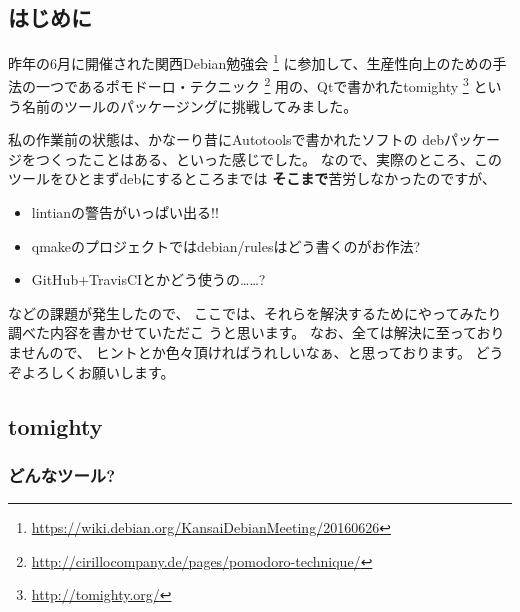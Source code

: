 \documentclass[mingoth,a4paper]{jsarticle}
\begin{document}

\subsection{はじめに}

昨年の6月に開催された関西Debian勉強会
\footnote{\url{https://wiki.debian.org/KansaiDebianMeeting/20160626}}
に参加して、生産性向上のための手法の一つであるポモドーロ・テクニック
\footnote{\url{http://cirillocompany.de/pages/pomodoro-technique/}}
用の、Qtで書かれたtomighty
\footnote{\url{http://tomighty.org/}}
という名前のツールのパッケージングに挑戦してみました。

私の作業前の状態は、かなーり昔にAutotoolsで書かれたソフトの
debパッケージをつくったことはある、といった感じでした。
なので、実際のところ、このツールをひとまずdebにするところまでは
\textbf{そこまで}苦労しなかったのですが、
\begin{itemize}
 \item lintianの警告がいっぱい出る!!
 \item qmakeのプロジェクトではdebian/rulesはどう書くのがお作法?
 \item GitHub+TravisCIとかどう使うの……?
\end{itemize}
などの課題が発生したので、
ここでは、それらを解決するためにやってみたり調べた内容を書かせていただこ
うと思います。
なお、全ては解決に至っておりませんので、
ヒントとか色々頂ければうれしいなぁ、と思っております。
どうぞよろしくお願いします。

\subsection{tomighty}

\subsubsection{どんなツール?}
\end{document}
